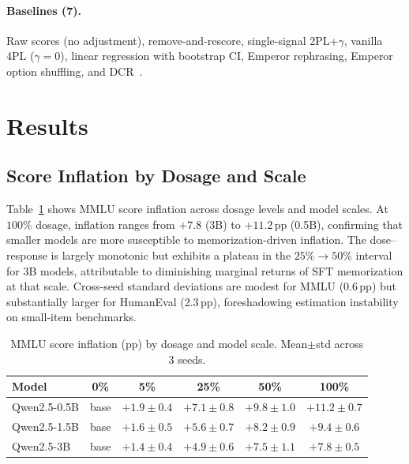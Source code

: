 \documentclass[letterpaper]{article}
\begin{document}
\paragraph{Baselines (7).} Raw scores (no adjustment), remove-and-rescore, single-signal 2PL+$\gamma$, vanilla 4PL ($\gamma{=}0$), linear regression with bootstrap CI, Emperor rephrasing, Emperor option shuffling, and DCR~\citep{dong2024generalization}.

\section{Results}
\label{sec:results}

\subsection{Score Inflation by Dosage and Scale}
\label{sec:inflation}

Table~\ref{tab:inflation} shows MMLU score inflation across dosage levels and model scales.
At $100\%$ dosage, inflation ranges from $+7.8$ (3B) to $+11.2$\,pp (0.5B), confirming that smaller models are more susceptible to memorization-driven inflation.
The dose--response is largely monotonic but exhibits a plateau in the $25\%{\to}50\%$ interval for 3B models, attributable to diminishing marginal returns of SFT memorization at that scale.
Cross-seed standard deviations are modest for MMLU (0.6\,pp) but substantially larger for HumanEval (2.3\,pp), foreshadowing estimation instability on small-item benchmarks.

\begin{table}[t]
\centering
\caption{MMLU score inflation (pp) by dosage and model scale. Mean$\pm$std across 3 seeds.}
\label{tab:inflation}
\begin{tabular}{lccccc}
\toprule
\textbf{Model} & \textbf{0\%} & \textbf{5\%} & \textbf{25\%} & \textbf{50\%} & \textbf{100\%} \\
\midrule
Qwen2.5-0.5B & base & $+1.9{\pm}0.4$ & $+7.1{\pm}0.8$ & $+9.8{\pm}1.0$ & $+11.2{\pm}0.7$ \\
Qwen2.5-1.5B & base & $+1.6{\pm}0.5$ & $+5.6{\pm}0.7$ & $+8.2{\pm}0.9$ & $+9.4{\pm}0.6$ \\
Qwen2.5-3B & base & $+1.4{\pm}0.4$ & $+4.9{\pm}0.6$ & $+7.5{\pm}1.1$ & $+7.8{\pm}0.5$ \\
\bottomrule
\end{tabular}
\end{table}
\end{document}
